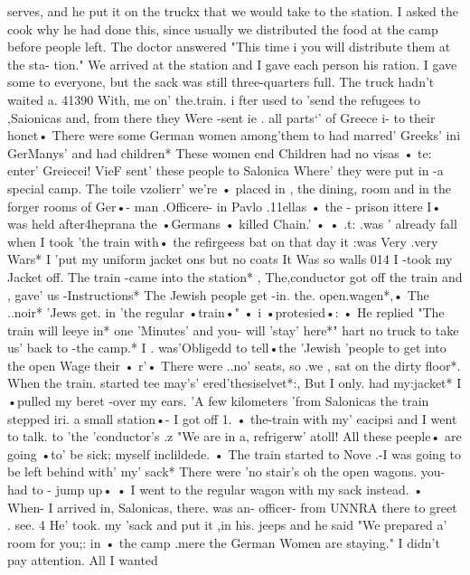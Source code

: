 serves, and he put it on the truckx that we would take to the station. I asked the 
cook why he had done this, since usually we distributed the food at the camp before 
people left. The doctor answered "This time i you will distribute them at the sta-
tion." 
We arrived at the station and I gave each person his ration. I gave some to 
everyone, but the sack was still three-quarters full. The truck hadn't waited a.
41390 
With, me on' the.train. 
i 
fter used to 'send the refugees to ,Saionicas and, from there they Were -sent ie . all 
parts`' of Greece i- to their honet• There were some German women among'them to had 
marred' Greeks' ini GerManys' and had children* These women end Children had no visas 
• te: enter' Greiecei! VieF sent' these people to Salonica Where' they were put in -a special 
camp. The toile vzolierr' we're • placed in , the dining, room and in the forger rooms of Ger•- 
man .Officere- in Pavlo .11ellas • the - prison ittere I• was held after4heprana the •Germans 
• killed Chain.' • 
• 
.t: 
.was ' already 
fall when I took 'the train with• the refirgeess bat on that day it 
:was Very .very Wars* I 'put my uniform jacket ons but no coats It Was so walls 014 
I -took my Jacket off. The train -came into the station* , The,conductor got off the 
train and , gave' us -Instructions* The Jewish people get -in. the. open.wagen*,• The ..noir* 
'Jews get. in 'the regular •train•" • i •protesied•: • He replied "The train will leeye in* 
one 'Minutes' and you- will 'stay' here*" hart no truck to take us' back to -the camp.* I . 
was'Obligedd to tell•the 'Jewish 'people to get into the open Wage%
their • r'• There were ..no' seats, so .we , sat on the dirty floor*. When the train. started tee 
may's' %
ered'thesiselvet*:, But I only. had my:jacket* I •pulled my beret -over my ears. 
'A few kilometers 'from Salonicas the train stepped iri. a small station•- I got off 1. 
• the-train with my' eacipsi and I went to talk. to 'the 'conductor's .z "We are in a, refrigerw' 
atoll! All these peeple• are going •to' be sick; myself inclildede. • The train started 
to Nove .-I was going to be left behind with' my' sack* There were 'no stair's oh the 
open wagons. you- had to - jump up• • I went to the regular wagon with my sack instead. 
• When- I arrived in, Salonicas, there. was an- officer- from UNNRA there to greet . see. 4 
He' took. my 'sack and put it ,in his. jeeps and he said "We prepared a' room for you;: in 
• the camp .mere the German Women are staying." I didn't pay attention. All I wanted 
